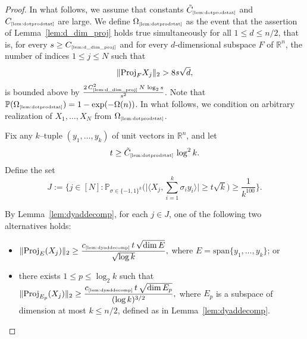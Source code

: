\documentclass[11pt]{amsart}
\theoremstyle{definition}
\theoremstyle{plain}
\newcommand{\R}{\mathbb{R}}
\def\Prob{{\mathbb P}}
\def\R{{\mathbb R}}
\def\Prob{{\mathbb P}}
\def\Proj{{\rm Proj}}
\newcommand{\tref}[1]{\text{\tiny{\ref{#1}}}}
\begin{document}
\begin{proof}
In what follows, we assume that constants
$\tilde C_{\text{\tiny\ref{lem:dotprodstat}}}$
and $C_{\text{\tiny\ref{lem:dotprodstat}}}$
are large.
We define $\Omega_{\text{\tiny\ref{lem:dotprodstat}}}$
as the event that the assertion of Lemma~\ref{lem:d_dim_proj}
holds true simultaneously for all $1\leq d\leq n/2$,
that is,
for every $s \ge C_{\tref{lem:d_dim_proj}}$ and
for every $d$-dimensional subspace $F$ of $\R^n$, the number of indices $1 \le j \le N$ such that
\[
\|\Proj_F X_j\|_2 > 8s \sqrt{d},
\]
is bounded above by
$\frac{2\,C_{\tref{lem:d_dim_proj}}^2\,N\, \log_2 s}{s^2}$.
Note that $\Prob(\Omega_{\text{\tiny\ref{lem:dotprodstat}}})=1-\exp(-\Omega(n))$.
In what follows, we condition on arbitrary realization
of $X_1,\dots,X_N$ from $\Omega_{\text{\tiny\ref{lem:dotprodstat}}}$.

\medskip

Fix any $k$--tuple $(y_1, \dots, y_k)$ of unit vectors in $\R^n$, and let 
\[
  t \ge \tilde{C}_{\text{\tiny\ref{lem:dotprodstat}}}
  \, \log^{2} k.
\]
Define the set
\[
  J :=
  \Bigg\{
    j \in [N] : 
    \mathbb{P}_{\sigma \in \{-1,1\}^k}
    \Big(
      \big| \big\langle X_j, \sum_{i=1}^k \sigma_i y_i \big\rangle \big|
      \ge t \sqrt{k}
    \Big)
    \ge \frac{1}{k^{100}}
  \Bigg\}.
\]

\medskip

By Lemma~\ref{lem:dyaddecomp}, for each $j \in J$, one of the following two alternatives holds:
\begin{itemize}
  \item[\textbf{(i)}] 
  \(
    \|\Proj_E(X_j)\|_2
    \ge
    \dfrac{c_{\tref{lem:dyaddecomp}} \, t \, \sqrt{\dim E}}
    {\sqrt{\log k}},
  \)
  where $E = \mathrm{span}\{y_1, \dots, y_k\}$; or
  \item[\textbf{(ii)}]
  there exists $1 \le p \le \log_2 k$ such that
  \(
    \|\Proj_{E_p}(X_j)\|_2
    \ge
    \dfrac{c_{\tref{lem:dyaddecomp}} \, t \,
    \sqrt{\dim E_p}}{(\log k)^{3/2}},
  \)
  where $E_p$ is a subspace of dimension at most $k\leq n/2$,
  defined as in Lemma~\ref{lem:dyaddecomp}.
\end{itemize}

\medskip


\end{proof}
\end{document}
